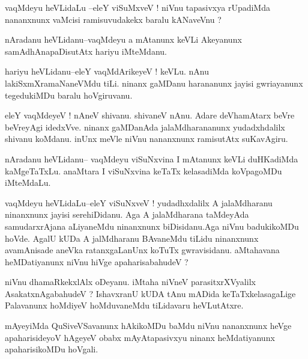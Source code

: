 \documentclass{article}
\begin{document}
\begin{mn}%
vaqMdeyu heVLidaLu --eleY viSuMxveV ! niVnu tapasivxya rUpadiMda nananxnunx vaMcisi 
ramisuvudakekx baralu kANaveVnu ?
\end{mn}

\begin{mn}%
nAradanu heVLidanu--vaqMdeyu a mAtanunx keVLi Akeyanunx samAdhAnapaDisutAtx hariyu iMteMdanu.
\end{mn}

\begin{mn}%
hariyu heVLidanu--eleY vaqMdArikeyeV ! keVLu. nAnu lakiSxmXramaNaneVMdu tiLi. ninanx gaMDanu 
harananunx jayisi gwriayanunx tegedukiMDu baralu hoVgiruvanu.
\end{mn}

\begin{mn}%
eleY vaqMdeyeV ! nAneV shivanu. shivaneV nAnu. Adare deVhamAtarx beVre beVreyAgi idedxVve. 
ninanx gaMDanAda jalaMdharananunx yudadxhdalilx shivanu koMdanu. inUnx meVle niVnu 
nananxnunx ramisutAtx suKavAgiru.
\end{mn}

\begin{mn}%
nAradanu heVLidanu-- vaqMdeyu viSuNxvina I mAtanunx keVLi duHKadiMda kaMgeTaTxLu. anaMtara I 
viSuNxvina keTaTx kelasadiMda koVpagoMDu iMteMdaLu.
\end{mn}

\begin{mn}%
vaqMdeyu heVLidaLu--eleY viSuNxveV ! yudadhxdalilx A jalaMdharanu ninanxnunx jayisi 
serehiDidanu. Aga A jalaMdharana taMdeyAda samudarxrAjana aLiyaneMdu ninanxnunx 
biDisidanu.Aga niVnu badukikoMDu hoVde. AgalU kUDa A jalMdharanu BAvaneMdu tiLidu 
ninanxnunx avamAnisade aneVka ratanxgaLanUnx koTuTx gwravisidanu. aMtahavana heMDatiyanunx 
niVnu hiVge apaharisabahudeV ?
\end{mn}

\begin{mn}%
niVnu dhamaRkekxlAlx oDeyanu. iMtaha niVneV parasitxrXVyalilx AsakatxnAgabahudeV ? 
IshavxranU kUDA tAnu mADida keTaTxkelasagaLige Palavanunx hoMdiyeV hoMduvaneMdu tiLidavaru 
heVLutAtxre.
\end{mn}

\begin{mn}%
mAyeyiMda QuSiveVSavanunx hAkikoMDu baMdu niVnu nananxnunx heVge apaharisideyoV hAgeyeV 
obabx mAyAtapasivxyu ninanx heMdatiyanunx apaharisikoMDu hoVgali.
\end{mn}
\end{document}
